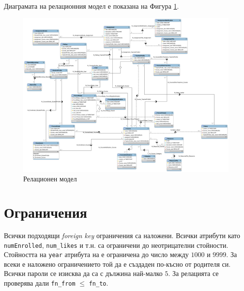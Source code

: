 \documentclass[a4paper,10pt, leqno]{article}
\newcommand{\attr}[1] {\texttt{#1}}
\newcommand{\la}[1] {\textsl{#1}}
\newcommand{\figref}[1] {Фигура \ref{#1}}
\begin{document}
      Диаграмата на релационния модел е показана на \figref{fig:rel}.
      \begin{figure}
	\label{fig:rel}
      	\caption{Релационен модел}
	 \centering
	 \includegraphics[width=21cm, angle=90]{../relational_model.png}
      \end{figure}

      \section{Ограничения}
      Всички подходящи \la{foreign key} ограничения са наложени. Всички атрибути като \attr{numEnrolled}, \attr{num\_likes} и т.н.
      са ограничени до неотрицателни стойности. Стойността на \attr{year} атрибута на  е ограничена до
      число между $1000$ и $9999$. За всеки  е наложено ограничението той да е създаден по-късно от родителя си.
      Всички пароли се изисква да са с дължина най-малко $5$. За релацията  се проверява дали \attr{fn\_from} $\leq$ \attr{fn\_to}.
\end{document}
